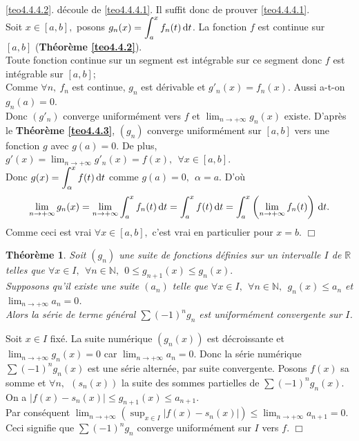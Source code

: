 \documentclass[11pt, a4paper]{book}
\newtheorem{teo}{Th\'eor\`eme}[section]
\newenvironment{pr}{\noindent {\bf Preuve} \noindent} {\hfill $\Box$\vskip 5mm}
\begin{document}
\begin{pr}\quad \ref{teo4.4.4.2}. d\'ecoule de \ref{teo4.4.4.1}. Il suffit donc de prouver \ref{teo4.4.4.1}.\\
Soit $x\in [a,b],$ posons ${\displaystyle g_n(x)=\int_a^x f_n(t)\,\mathrm{d} t}$. La fonction $f$ est continue sur $[a,b]$ (\textbf{Th\'eor\`eme \ref{teo4.4.2}}).\\
Toute fonction continue sur un segment est int\'egrable sur ce segment donc $f$ est int\'egrable sur $[a,b]$;\\ Comme $\forall n,~f_n$ est continue, $g_n$ est d\'erivable et $g'_n(x)=f_n(x).$ Aussi a-t-on $g_n(a)=0$.\\ Donc $(g'_n)$ converge uniform\'ement vers $f$ et ${\displaystyle \lim_{n\rightarrow+\infty}g_n(x)}$ existe. D'apr\`es le \textbf{Th\'eor\`eme \ref{teo4.4.3}}, $(g_n)$ converge uniform\'ement sur $[a,b]$ vers une fonction $g$ avec $g(a)=0$. De plus, ${\displaystyle g'(x)=\lim_{n\rightarrow+\infty}g'_n(x)=f(x),~~\forall x\in [a,b].}$\\
Donc ${\displaystyle g(x)=\int_\alpha^x f(t)\,\mathrm{d} t}$ comme $g(a)=0,~~\alpha=a.$ D'o\`u $$\lim_{n\rightarrow+\infty}g_n(x)=\lim_{n\rightarrow+\infty}\int_a^x f_n(t)\,\mathrm{d} t=\int_a^x f(t)\,\mathrm{d} t=\int_a^x\left(\lim_{n\rightarrow+\infty}f_n(t)\right)\,\mathrm{d} t.$$
Comme ceci est vrai $\forall x\in [a,b],$ c'est vrai en particulier pour $x=b$. 
\end{pr}
\begin{teo} \label{teo4.4.5}
Soit $(g_n)$ une suite de fonctions d\'efinies sur un intervalle $I$ de $\mathbb{R}$ telles que $\forall x\in I,~~\forall n\in \mathbb{N},~~0\leq g_{n+1}(x)\leq g_n(x).$\\
Supposons qu'il existe une suite $(a_n)$ telle que $\forall x\in I,~~\forall n\in \mathbb{N},~~g_n(x)\leq a_n$ et ${\displaystyle \lim_{n\rightarrow+\infty} a_n=0}$. \\
Alors la s\'erie de terme g\'en\'eral $\sum(-1)^ng_n$ est uniform\'ement convergente sur $I$.
\end{teo}
\begin{pr}\quad

Soit $x\in I$ fix\'e. La suite num\'erique $(g_n(x))$ est d\'ecroissante et ${\displaystyle \lim_{n\rightarrow+\infty}g_n(x)=0}$ car ${\displaystyle \lim_{n\rightarrow+\infty}a_n=0}$. Donc la s\'erie num\'erique ${\displaystyle \sum (-1)^ng_n(x)}$ est une s\'erie altern\'ee, par suite convergente. Posons $f(x)$ sa somme et $\forall n,~~(s_n(x))$ la suite des sommes partielles de ${\displaystyle \sum (-1)^ng_n(x)}$. On a $|f(x)-s_n(x)|\leq g_{n+1}(x)\leq a_{n+1}.$ \\Par cons\'equent ${\displaystyle \lim_{n\rightarrow+\infty}\left(\sup_{x\in I}|f(x)-s_n(x)|\right)\leq \lim_{n\rightarrow+\infty}a_{n+1}=0.}$ Ceci signifie que $\sum(-1)^ng_n$ converge uniform\'ement sur $I$ vers $f.$
\end{pr}
\end{document}
